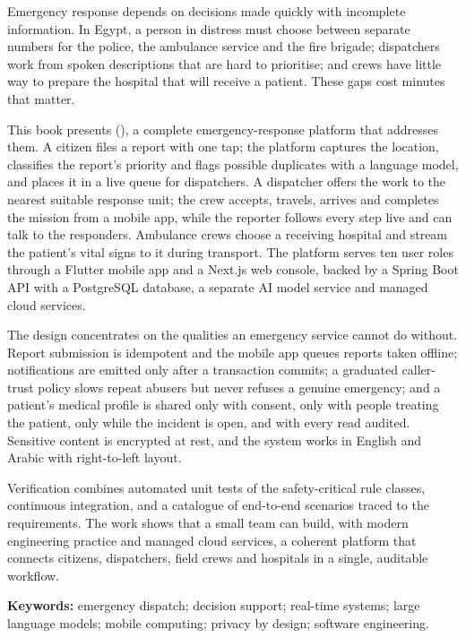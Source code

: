 
Emergency response depends on decisions made quickly with incomplete information. In Egypt, a
person in distress must choose between separate numbers for the police, the ambulance service
and the fire brigade; dispatchers work from spoken descriptions that are hard to prioritise; and
crews have little way to prepare the hospital that will receive a patient. These gaps cost
minutes that matter.

This book presents \textbf{\ProjectName} (\ProjectFullName), a complete emergency-response
platform that addresses them. A citizen files a report with one tap; the platform captures
the location, classifies the report's priority and flags possible duplicates with a
language model, and places it in a live queue for dispatchers. A dispatcher offers the
work to the nearest suitable response unit; the crew accepts, travels, arrives and completes
the mission from a mobile app, while the reporter follows every step live and can talk to the
responders. Ambulance crews choose a receiving hospital and stream the patient's vital signs
to it during transport. The platform serves ten user roles through a Flutter mobile app and a
Next.js web console, backed by a Spring Boot API with a PostgreSQL database, a separate AI
model service and managed cloud services.

The design concentrates on the qualities an emergency service cannot do without. Report
submission is idempotent and the mobile app queues reports taken offline; notifications are
emitted only after a transaction commits; a graduated caller-trust policy slows repeat abusers
but never refuses a genuine emergency; and a patient's medical profile is shared only with
consent, only with people treating the patient, only while the incident is open, and with every
read audited. Sensitive content is encrypted at rest, and the system works in English and
Arabic with right-to-left layout.

Verification combines automated unit tests of the safety-critical rule classes, continuous
integration, and a catalogue of end-to-end scenarios traced to the requirements. The work shows
that a small team can build, with modern engineering practice and managed cloud services, a
coherent platform that connects citizens, dispatchers, field crews and hospitals in a single,
auditable workflow.

\vspace{0.3cm}
\noindent\textbf{Keywords:} emergency dispatch; decision support; real-time systems;
large language models; mobile computing; privacy by design; software engineering.
\clearpage
